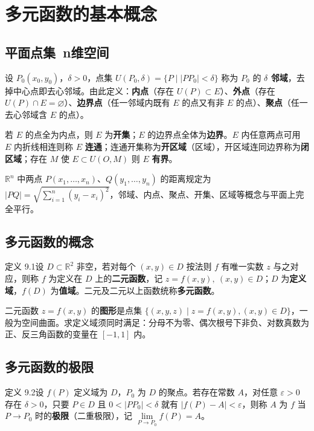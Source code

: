 
\section{多元函数的基本概念}

\subsection{平面点集\ n维空间}

设 $P_0(x_0,y_0)$，$\delta>0$，点集 $U(P_0,\delta)=\{P\mid|PP_0|<\delta\}$ 称为 $P_0$ 的 \textbf{$\delta$ 邻域}，去掉中心点即去心邻域。由此定义：\textbf{内点}（存在 $U(P)\subset E$）、\textbf{外点}（存在 $U(P)\cap E=\varnothing$）、\textbf{边界点}（任一邻域内既有 $E$ 的点又有非 $E$ 的点）、\textbf{聚点}（任一去心邻域含 $E$ 的点）。

若 $E$ 的点全为内点，则 $E$ 为\textbf{开集}；$E$ 的边界点全体为\textbf{边界}。$E$ 内任意两点可用 $E$ 内折线相连则称 $E$ \textbf{连通}；连通开集称为\textbf{开区域}（区域），开区域连同边界称为\textbf{闭区域}；存在 $M$ 使 $E\subset U(O,M)$ 则 $E$ \textbf{有界}。

$\mathbb R^n$ 中两点 $P(x_1,\dots,x_n)$、$Q(y_1,\dots,y_n)$ 的距离规定为 $|PQ|=\sqrt{\sum_{i=1}^{n}(y_i-x_i)^{2}}$，邻域、内点、聚点、开集、区域等概念与平面上完全平行。

\subsection{多元函数的概念}

定义 9.1\quad 设 $D\subset\mathbb R^2$ 非空，若对每个 $(x,y)\in D$ 按法则 $f$ 有唯一实数 $z$ 与之对应，则称 $f$ 为定义在 $D$ 上的\textbf{二元函数}，记 $z=f(x,y),\ (x,y)\in D$；$D$ 为\textbf{定义域}，$f(D)$ 为\textbf{值域}。二元及二元以上函数统称\textbf{多元函数}。

二元函数 $z=f(x,y)$ 的\textbf{图形}是点集 $\{(x,y,z)\mid z=f(x,y),(x,y)\in D\}$，一般为空间曲面。求定义域须同时满足：分母不为零、偶次根号下非负、对数真数为正、反三角函数的变量在 $[-1,1]$ 内。

\subsection{多元函数的极限}

定义 9.2\quad 设 $f(P)$ 定义域为 $D$，$P_0$ 为 $D$ 的聚点。若存在常数 $A$，对任意 $\varepsilon>0$ 存在 $\delta>0$，只要 $P\in D$ 且 $0<|PP_0|<\delta$ 就有 $|f(P)-A|<\varepsilon$，则称 $A$ 为 $f$ 当 $P\to P_0$ 时的\textbf{极限}（二重极限），记 $\lim\limits_{P\to P_0}f(P)=A$。

